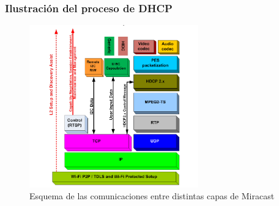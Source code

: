 \begin{frame}
  \frametitle{Ilustración del proceso de DHCP}
  \begin{figure}[ht]
    \centering
    \includegraphics[width=0.65\textwidth]{./Imagenes/HDCP_miracast_layers.png}
    \caption{Esquema de las comunicaciones entre distintas capas de Miracast}
  \end{figure}
\end{frame}
